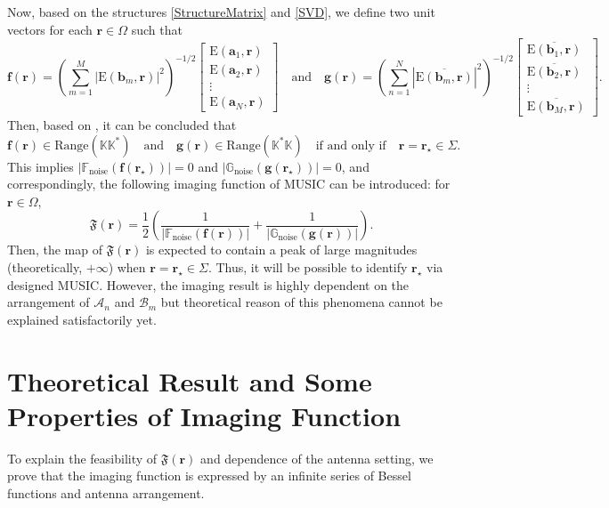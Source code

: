 \documentclass[3p,10pt]{elsarticle}
\newcommand{\E}{\mathrm{E}}
\newcommand{\ma}{\mathbf{a}}
\newcommand{\mb}{\mathbf{b}}
\newcommand{\mf}{\mathbf{f}}
\newcommand{\mg}{\mathbf{g}}
\newcommand{\mr}{\mathbf{r}}
\DeclareMathOperator*{\noise}{noise}
\theoremstyle{plain}
\theoremstyle{remark}
\begin{document}
Now, based on the structures \eqref{StructureMatrix} and \eqref{SVD}, we define two unit vectors for each $\mr\in\Omega$ such that
\begin{equation}\label{TestVector}
\mf(\mr)=\left(\sum_{m=1}^M|\E(\mb_m,\mr)|^2\right)^{-1/2}%
\begin{bmatrix}
\E(\ma_1,\mr)\\
\E(\ma_2,\mr)\\
\vdots\\
\E(\ma_N,\mr)
\end{bmatrix}
\quad\text{and}\quad
\mg(\mr)=\left(\sum_{n=1}^N|\overline{\E(\mb_m,\mr)}|^2\right)^{-1/2}%
\begin{bmatrix}
\overline{\E(\mb_1,\mr)}\\
\overline{\E(\mb_2,\mr)}\\
\vdots\\\overline{\E(\mb_M,\mr)}
\end{bmatrix}.
\end{equation}
Then, based on \cite{P-MUSIC6,C,AK2}, it can be concluded that
\[\mf(\mr)\in\text{Range}(\mathbb{KK}^*)\quad\text{and}\quad\mg(\mr)\in\text{Range}(\mathbb{K^*}\mathbb{K})\quad\text{if and only if}\quad \mr=\mr_\star\in\Sigma.\]
This implies $|\mathbb{F}_{\noise}(\mf(\mr_\star))|=0$ and $|\mathbb{G}_{\noise}(\mg(\mr_\star))|=0$, and correspondingly, the following imaging function of MUSIC can be introduced: for $\mr\in\Omega$,
\[\mathfrak{F}(\mr)=\frac12\left(\frac{1}{|\mathbb{F}_{\noise}(\mf(\mr))|}+\frac{1}{|\mathbb{G}_{\noise}(\mg(\mr))|}\right).\]
Then, the map of $\mathfrak{F}(\mr)$ is expected to contain a peak of large magnitudes (theoretically, $+\infty$) when $\mr=\mr_\star\in\Sigma$. Thus, it will be possible to identify $\mr_\star$ via designed MUSIC. However, the imaging result is highly dependent on the arrangement of $\mathcal{A}_n$ and $\mathcal{B}_m$ but theoretical reason of this phenomena cannot be explained satisfactorily yet.

\section{Theoretical Result and Some Properties of Imaging Function}\label{sec:3}
To explain the feasibility of $\mathfrak{F}(\mr)$ and dependence of the antenna setting, we prove that the imaging function is expressed by an infinite series of Bessel functions and antenna arrangement.%
\end{document}
